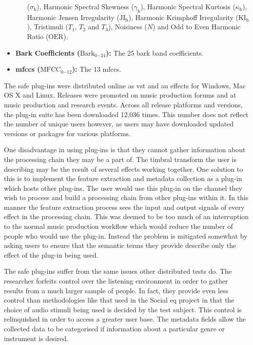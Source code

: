 \begin{itemize}
\begin{itemize}
				      ($\sigma_{\mathrm{h}}$), Harmonic Spectral Skewness ($\gamma_{\mathrm{h}}$), Harmonic
				      Spectral Kurtosis ($\kappa_{\mathrm{h}}$), Harmonic Jensen Irregularity
				      ($\mathrm{JI_{h}}$), Harmonic Krimphoff Irregularity
				      ($\mathrm{KI_{h}}$), Tristimuli ($T_{1}$, $T_{2}$ and $T_{3}$), Noisiness
				      ($N$) and Odd to Even Harmonic Ratio ($\mathrm{OER}$).
			\end{itemize}
			\item {\bf{Bark Coefficients (}}$\mathrm{Bark}_{0\mathrm{-}24}${\bf{):}} The 25 bark band
			      coefficients.
		      \item {\bf{\acrshort{mfccs} (}}$\mathrm{MFCC}_{0\mathrm{-}12}${\bf{):}} The 13 \acrshort{mfccs}.
		\end{itemize}

		The \acrshort{safe} plug-ins were distributed online as \acrshort{vst} and \acrshort{au} effects for
		Windows, Mac OS X and Linux.  Releases were promoted on music production forums and at music production and
		research events. Across all release platforms and versions, the plug-in suite has been downloaded 12,036
		times. This number does not reflect the number of unique users however, as users may have downloaded
		updated versions or packages for various platforms.

		One disadvantage in using plug-ins is that they cannot gather information about the processing chain they
		may be a part of. The timbral transform the user is describing may be the result of several effects working
		together. One solution to this is to implement the feature extraction and metadata collection as a plug-in
		which hosts other plug-ins. The user would use this plug-in on the channel they wish to process and build a
		processing chain from other plug-ins within it. In this manner the feature extraction process sees the
		input and output signals of every effect in the processing chain. This was deemed to be too much of an
		interruption to the normal music production workflow which would reduce the number of people who would use
		the plug-in. Instead the problem is mitigated somewhat by asking users to ensure that the semantic terms
		they provide describe only the effect of the plug-in being used.

		The \acrshort{safe} plug-ins suffer from the same issues other distributed tests do. The researcher
		forfeits control over the listening environment in order to gather results from a much larger sample of
		people. In fact, they provide even less control than methodologies like that used in the Social
		\acrshort{eq} project \citep{cartwright2013socialeq} in that the choice of audio stimuli being used is
		decided by the test subject. This control is relinquished in order to access a greater user base. The
		metadata fields allow the collected data to be categorised if information about a particular genre or
		instrument is desired.

